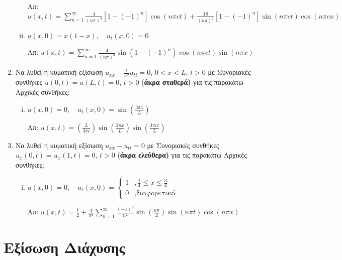 \documentclass[a4paper,table]{report}
\begin{document}
\begin{enumerate}
\begin{enumerate}[(i)]
			\hfill Απ: $ u(x,t) = \sum_{n=1}^{\infty} \frac{ 4 }{ (n\pi)^{3} } [1-(-1)^{n}]
			\cos{(n\pi c t)} + \frac{ 18 }{ (n\pi)^{2} } [1-(-1)^{n}] \sin{(n\pi c t)} \cos{(n\pi c
			x)} $
			 
		\item $ u(x,0) = x(1-x), \quad u_t(x,0) = 0 $ 

			\hfill Απ: $ u(x,t) = \sum_{n=1}^{\infty} \frac{ 4 }{ (n\pi)^{3} } \sin{(1-(-1)^{n})}
			\cos{(n\pi c t)} \sin{(n\pi x)}  $

		\end{enumerate}


\item Να λυθεί η κυματική εξίσωση $ u_{xx} - \frac{1}{ a^{2} } u_{tt} = 0 $, $ 0<x<L $, $ t>0
	$ με Συνοριακές συνθήκες $ u(0,t) = u(L,t) = 0 $, $ t>0 $ (\textbf{άκρα σταθερά)} για τις παρακάτω Αρχικές συνθήκες:

	\begin{enumerate}[(i)]
		\item $ u(x,0) = 0, \quad u_t(x,0) = \sin{\left(\frac{ 3\pi x }{ L }\right)} $ 

			\hfill Απ: $ u(x,t) = \left(\frac{ L }{ 3\pi c }\right) \sin{\left(\frac{ 3\pi x  }{ L
		}\right)} \sin{\left(\frac{3 \pi c t}{L}\right)} $
			
	\end{enumerate}




\item Να λυθεί η κυματική εξίσωση $ u_{xx} - u_{tt} = 0 $ με Συνοριακές συνθήκες
	$ u_x(0,t) = u_x(1,t) = 0 $, $ t>0 $ (\textbf{άκρα ελεύθερα)} για τις παρακάτω Αρχικές συνθήκες:

	\begin{enumerate}[(i)]
			\item $ u(x,0) = 0,\quad  u_t(x,0) = \begin{cases} 1 &, \frac{1}{ 4 } \leq x \leq \frac{
		3 }{ 4 }  \\ 0 &, \text{διαφορετικά}
		\end{cases}$	

		\hfill Απ: $ u(x,t) = \frac{ t }{ 2 } + \frac{ 4 }{ \pi^{2} } \sum_{n=1}^{\infty} \frac{
			(-1)^{n} }{ n^{2} } \sin{\left(\frac{ n\pi }{ 2 }\right)} \sin{(n\pi t)} \cos{(n\pi x)} $ 
	\end{enumerate}
\end{enumerate}


\section{Εξίσωση Διάχυσης}
\end{document}
